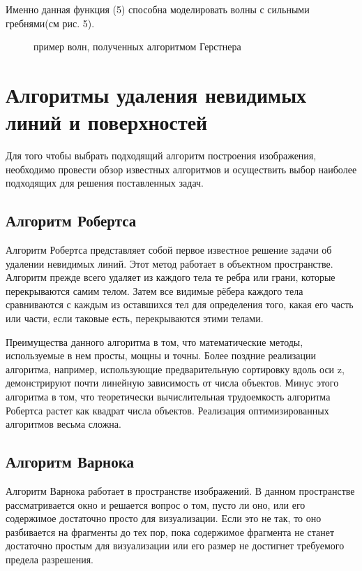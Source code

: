 Именно данная функция (5) способна моделировать волны с сильными гребнями(см рис. 5).

\begin{figure}[h]
	\caption{пример волн, полученных алгоритмом Герстнера}
\end{figure}

\section{Алгоритмы удаления невидимых линий и поверхностей}

Для того чтобы выбрать подходящий алгоритм построения изображения, необходимо провести обзор известных алгоритмов и осуществить выбор наиболее подходящих для решения поставленных задач.

\subsection{Алгоритм Робертса}

Алгоритм Робертса \cite{roberts} представляет собой первое известное решение задачи об удалении невидимых линий. Этот метод работает в объектном пространстве. Алгоритм прежде всего удаляет из каждого тела те ребра или грани, которые перекрываются самим телом. Затем все видимые рёбера каждого тела сравниваются с каждым из оставшихся тел для определения того, какая его часть или части, если таковые есть, перекрываются этими телами.
 
Преимущества данного алгоритма в том, что математические методы, используемые в нем просты, мощны и точны. Более поздние реализации алгоритма, например, использующие предварительную сортировку вдоль оси z, демонстрируют почти линейную зависимость от числа объектов.
Минус этого алгоритма в том, что теоретически вычислительная трудоемкость алгоритма Робертса растет как квадрат числа объектов. Реализация оптимизированных алгоритмов весьма сложна.

\subsection{Алгоритм Варнока}
Алгоритм Варнока \cite{varnoka} работает в пространстве изображений. В данном пространстве рассматривается окно и решается вопрос о том, пусто ли оно, или его содержимое достаточно просто для визуализации. Если это не так, то оно разбивается на фрагменты до тех пор, пока содержимое фрагмента не станет достаточно простым для визуализации или его размер не достигнет требуемого предела разрешения.
 
